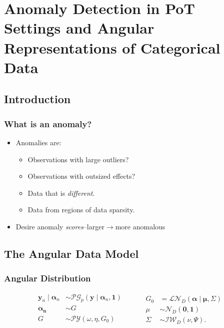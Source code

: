 \documentclass[aspectratio=169,10pt]{beamer}
\begin{document}
\section[Anomaly Detection]{Anomaly Detection in PoT Settings and Angular Representations of Categorical Data}
\subsection{Introduction}

\begin{frame}
    \frametitle{What is an anomaly?}
    \label{ndpg:anomaly}
    \begin{itemize}
        \item Anomalies are:
        \begin{itemize}
            \item Observations with large outliers?
            \item Observations with outsized effects?
            \item Data that is \emph{different}.
            \item Data from regions of data sparsity.
        \end{itemize}
        \item Desire anomaly \emph{scores}--larger$\rightarrow$more anomalous
    \end{itemize}
    \hyperlink{ndpg:anomalymethods}{}
\end{frame} %

\subsection{The Angular Data Model}

\begin{frame}
    \frametitle{Angular Distribution}
    \[
        \begin{aligned}
        \bm{y}_n \mid \bm{\alpha}_n &\sim \mathcal{PG}_p
                \left(\bm{y}\mid\bm{\alpha}_n, \bm{1}\right)\\
        \bm{\alpha_n} &\sim G\\
        G &\sim \mathcal{PY}\left(\omega, \eta, G_0\right)\\
        \end{aligned}
        ~\hspace{1cm}
        \begin{aligned}
        G_0 &= \mathcal{LN}_D\left(\bm{\alpha}\mid\bm{\mu},\Sigma\right)\\
        \mu &\sim \mathcal{N}_D\left(\bm{0},\bm{1}\right)\\
        \Sigma &\sim \mathcal{IW}_D\left(\nu, \Psi\right).
        \end{aligned}
    \]
\end{frame} %
\end{document}
